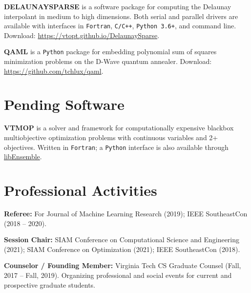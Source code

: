 \documentclass[11pt]{article}
\begin{document}
\textbf{DELAUNAYSPARSE} is a software package for computing the Delaunay
interpolant in medium to high dimensions.
Both serial and parallel drivers are available with interfaces in
\texttt{Fortran},
\texttt{C/C++},
\texttt{Python 3.6+},
and command line.
Download: \url{https://vtopt.github.io/DelaunaySparse}.

\textbf{QAML} is a \texttt{Python} package for embedding polynomial sum of
squares minimization problems on the D-Wave quantum annealer.
Download: \url{https://github.com/tchlux/qaml}.

\section*{Pending Software}

\textbf{VTMOP} is a solver and framework for computationally
expensive blackbox multiobjective optimization problems with continuous
variables and 2+ objectives.
Written in \texttt{Fortran}; a \texttt{Python} interface is also available
through
\href{https://github.com/Libensemble/libensemble/blob/master/libensemble/gen_funcs/vtmop.py}{libEnsemble}.




\section*{Professional Activities}

\textbf{Referee:} For
Journal of Machine Learning Research (2019);
IEEE SoutheastCon (2018 -- 2020).

\textbf{Session Chair:}
SIAM Conference on Computational Science and Engineering (2021);
SIAM Conference on Optimization (2021);
IEEE SoutheastCon (2018).

\textbf{Counselor / Founding Member:} Virginia Tech CS Graduate Counsel 
(Fall, 2017 -- Fall, 2019).
Organizing professional and social events for
current and prospective graduate students.
\end{document}
